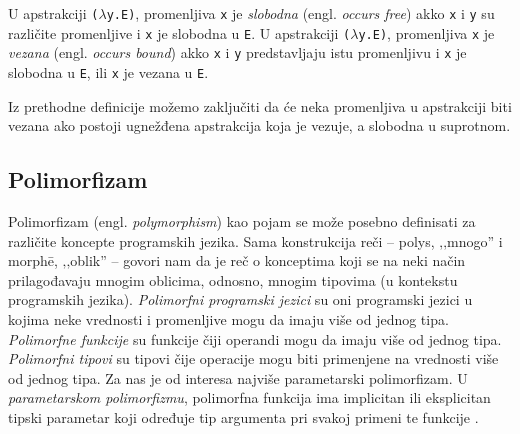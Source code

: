\begin{definicija}
	U apstrakciji \verb|(|$\lambda$\verb|y.E)|, promenljiva \verb|x| je \textit{slobodna} (engl. \textit{occurs free}) akko \verb|x| i \verb|y| su različite promenljive i \verb|x| je slobodna u \verb|E|. U apstrakciji \verb|(|$\lambda$\verb|y.E)|, promenljiva \verb|x| je \textit{vezana} (engl. \textit{occurs bound}) akko \verb|x| i \verb|y| predstavljaju istu promenljivu i \verb|x| je slobodna u \verb|E|, ili \verb|x| je vezana u \verb|E|.
\end{definicija}

Iz prethodne definicije možemo zaključiti da će neka promenljiva u apstrakciji biti vezana ako postoji ugnežđena apstrakcija koja je vezuje, a slobodna u suprotnom.

\subsection{Polimorfizam}
\label{subsec:polimorfizam}

Polimorfizam (engl. \textit{polymorphism}) kao pojam se može posebno definisati za različite koncepte programskih jezika. Sama konstrukcija reči -- polys, ‚‚mnogo'' i morph\={e}, ‚‚oblik'' -- govori nam da je reč o konceptima koji se na neki način prilagođavaju mnogim oblicima, odnosno, mnogim tipovima (u kontekstu programskih jezika). \textit{Polimorfni programski jezici} su oni programski jezici u kojima neke vrednosti i promenljive mogu da imaju više od jednog tipa. \textit{Polimorfne funkcije} su funkcije čiji operandi mogu da imaju više od jednog tipa. \textit{Polimorfni tipovi} su tipovi čije operacije mogu biti primenjene na vrednosti više od jednog tipa. Za nas je od interesa najviše parametarski polimorfizam. U \textit{parametarskom polimorfizmu}, polimorfna funkcija ima implicitan ili eksplicitan tipski parametar koji određuje tip argumenta pri svakoj primeni te funkcije \cite{On-Understanding-Types-Data-Abstraction-and-Polymorphism}.

